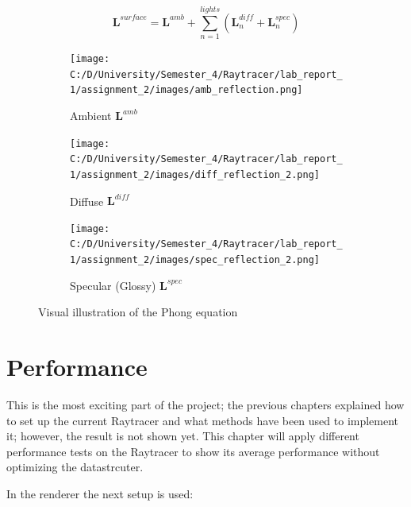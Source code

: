 \documentclass[11pt,a4paper]{article}
\begin{document}
	\begin{equation}
		\pmb{L}^{surface}= \pmb{L}^{amb} + \sum_{n=1}^{lights} (\pmb{L}_n^{diff} + \pmb{L}_n^{spec})
	\end{equation}
	
	
	\begin{figure}[ht]
		\begin{center}
			\begin{subfigure}{.3\textwidth}
				\centering
				\texttt{[image: C:/D/University/Semester\_4/Raytracer/lab\_report\_1/assignment\_2/images/amb\_reflection.png]}  
				\caption{Ambient $ \pmb{L}^{amb} $}
				\label{fig:sub-first}
			\end{subfigure}
			\begin{subfigure}{.3\textwidth}
				\centering
				\texttt{[image: C:/D/University/Semester\_4/Raytracer/lab\_report\_1/assignment\_2/images/diff\_reflection\_2.png]}  
				\caption{Diffuse $ \pmb{L}^{diff} $}
				\label{fig:sub-second}
			\end{subfigure}
			\begin{subfigure}{.3\textwidth}
				\centering
				\texttt{[image: C:/D/University/Semester\_4/Raytracer/lab\_report\_1/assignment\_2/images/spec\_reflection\_2.png]}  
				\caption{ Specular (Glossy)  $ \pmb{L}^{spec} $}
				\label{fig:sub-third}
			\end{subfigure}
			
			\caption{Visual illustration of the Phong equation}
			\label{fig:6}
		\end{center}
	\end{figure}


	\section{Performance}
	This is the most exciting part of the project; the previous chapters explained how to set up the current Raytracer and what methods have been used to implement it; however, the result is not shown yet. This chapter will apply different performance tests on the Raytracer to show its average performance without optimizing the datastrcuter. 
	
	In the renderer the next setup is used: 
	
\end{document}
